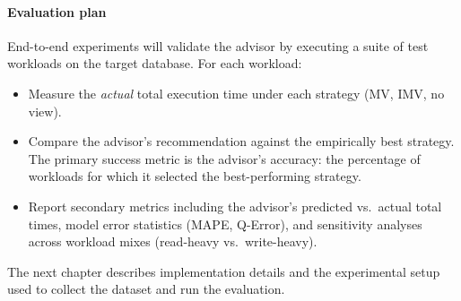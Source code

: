 \paragraph{Evaluation plan}
End-to-end experiments will validate the advisor by executing a suite of test workloads on the target database. For each workload:
\begin{itemize}
    \item Measure the \emph{actual} total execution time under each strategy (MV, IMV, no view).
    \item Compare the advisor's recommendation against the empirically best strategy. The primary success metric is the advisor's accuracy: the percentage of workloads for which it selected the best-performing strategy.
    \item Report secondary metrics including the advisor's predicted vs.\ actual total times, model error statistics (MAPE, Q-Error), and sensitivity analyses across workload mixes (read-heavy vs.\ write-heavy).
\end{itemize}

The next chapter describes implementation details and the experimental setup used to collect the dataset and run the evaluation.
